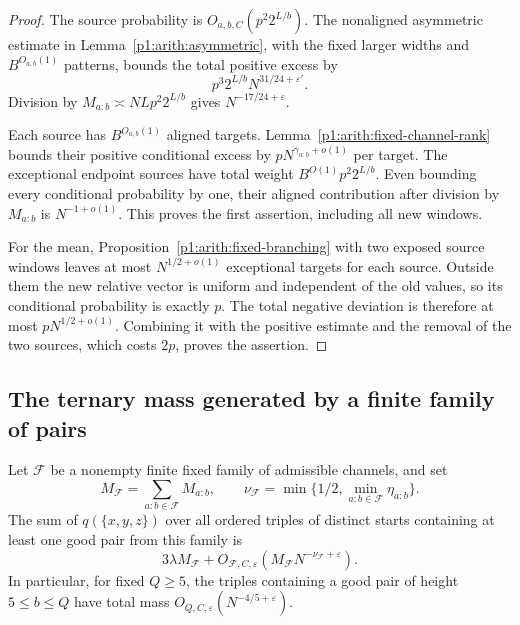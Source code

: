 \begin{proof}
The source probability is \(O_{a,b,C}(p^2 2^{L/b})\).
The nonaligned asymmetric estimate
in Lemma~\ref{p1:arith:asymmetric}, with the fixed larger widths and
\(B^{O_{a,b}(1)}\) patterns, bounds the total positive excess by
\[
 p^3 2^{L/b}N^{31/24+\varepsilon'}.
\]
Division by \(M_{a:b}\asymp NLp^2 2^{L/b}\) gives
\(N^{-17/24+\varepsilon}\).

Each source has \(B^{O_{a,b}(1)}\) aligned targets.
Lemma~\ref{p1:arith:fixed-channel-rank} bounds their positive conditional
excess by \(pN^{\gamma_{a:b}+o(1)}\) per target.
The exceptional endpoint sources have total weight
\(B^{O(1)}p^2 2^{L/b}\).
Even bounding every conditional probability by one, their aligned
contribution after division by \(M_{a:b}\) is \(N^{-1+o(1)}\).
This proves the first assertion, including all new windows.

For the mean, Proposition~\ref{p1:arith:fixed-branching} with two
exposed source windows leaves at most \(N^{1/2+o(1)}\) exceptional
targets for each source.
Outside them the new relative vector is uniform and independent of
the old values, so its conditional probability is exactly \(p\).
The total negative deviation is therefore at most \(pN^{1/2+o(1)}\).
Combining it with the positive estimate and the removal of the two
sources, which costs \(2p\), proves the assertion.
\end{proof}

\subsection{The ternary mass generated by a finite family of pairs}

\begin{corollary}
\label{p1:arith:finite-family-triples}
Let \(\mathcal F\) be a nonempty finite fixed family of admissible
channels, and set
\[
 M_{\mathcal F}=\sum_{a:b\in\mathcal F}M_{a:b},\qquad
 \nu_{\mathcal F}=
 \min\{1/2,\min_{a:b\in\mathcal F}\eta_{a:b}\}.
\]
The sum of \(q(\{x,y,z\})\) over all ordered triples of distinct starts
containing at least one good pair from this family is
\[
 3\lambda M_{\mathcal F}
 +O_{\mathcal F,C,\varepsilon}
    (M_{\mathcal F}N^{-\nu_{\mathcal F}+\varepsilon}).
\]
In particular, for fixed \(Q\geq5\), the triples containing a good
pair of height \(5\leq b\leq Q\) have total mass
\(O_{Q,C,\varepsilon}(N^{-4/5+\varepsilon})\).
\end{corollary}

